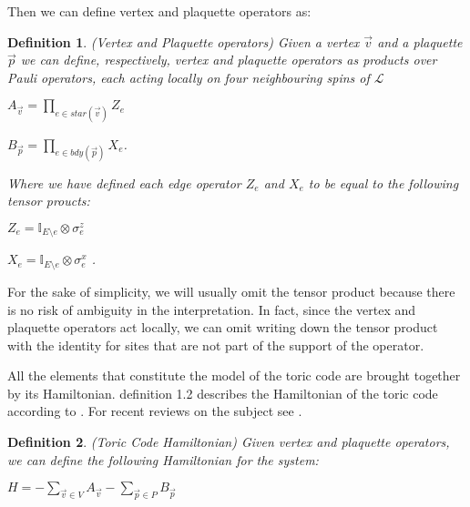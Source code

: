 \documentclass{Configuration_Files/PoliMi3i_thesis}
\newtheorem{definition}{Definition}[chapter]
\begin{document}
Then we can define vertex and plaquette operators as:

\begin{definition} (Vertex and Plaquette operators) Given a vertex $\vec{v}$ and a plaquette $\vec{p}$ we can define, respectively, vertex and plaquette operators as products over Pauli operators, each acting locally on four neighbouring spins of $\mathcal{L}$
	
\begin{center}
	$ A_{\vec{v}} = \prod_{e \in star(\vec{v})} Z_e $ 
	
	$ B_{\vec{p}} = \prod_{e \in bdy(\vec{p})} X_e $.
\end{center}

Where we have defined each edge operator $Z_e$ and $X_e$ to be equal to the following tensor proucts:

\begin{center}
	
	$Z_e = \mathbb{I}_{{E} \setminus  e} \otimes \sigma^z_{e}$ 
	
	$X_e = \mathbb{I}_{{E} \setminus  e} \otimes \sigma^x_{e} $ .
	
\end{center}
\end{definition}

For the sake of simplicity, we will usually omit the tensor product because there is no risk of ambiguity in the interpretation. In fact, since the vertex and plaquette operators act locally, we can omit writing down the tensor product with the identity for sites that are not part of the support of the operator. 
 



All the elements that constitute the model of the toric code are brought together by its Hamiltonian. definition 1.2 describes the Hamiltonian of the toric code 
{according to \cite{Kit02}}. For recent reviews on the subject see \cite{Her20}.

\begin{definition} (Toric Code Hamiltonian) Given vertex and plaquette operators, we can define the following Hamiltonian for the system:
\end{definition}

\begin{center}
	
	$H = -\sum_{\vec{v} \in V}
	A_{\vec{v}} - \sum_{\vec{p} \in P} B_{\vec{p}} $
	
\end{center}
\end{document}
